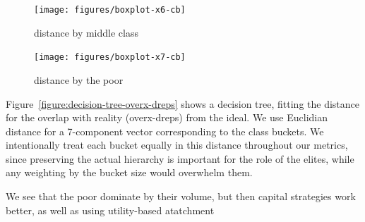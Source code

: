 \documentclass[10pt,oneside]{memoir}
\begin{document}
\begin{Spacing}{2}
\begin{figure}[ht]
\bigskip

\centering
\texttt{[image: figures/boxplot-x6-cb]}
\label{figure:boxplot-x6}
\caption{distance by middle class}
\endminipage\hfill%
%
\centering
\texttt{[image: figures/boxplot-x7-cb]}
\label{figure:boxplot-x7}
\caption{distance by the poor}
\endminipage
\end{figure}

Figure~\ref{figure:decision-tree-overx-dreps} shows a decision tree, fitting the distance for the overlap with reality (overx-dreps) from the ideal.  We use Euclidian distance for a 7-component vector corresponding to the class buckets.  We intentionally treat each bucket equally in this distance throughout our metrics, since preserving the actual hierarchy is important for the role of the elites, while any weighting by the bucket size would overwhelm them.


We see that the poor dominate by their volume, but then capital strategies work better, as well as using utility-based atatchment




\end{Spacing}
\end{document}
